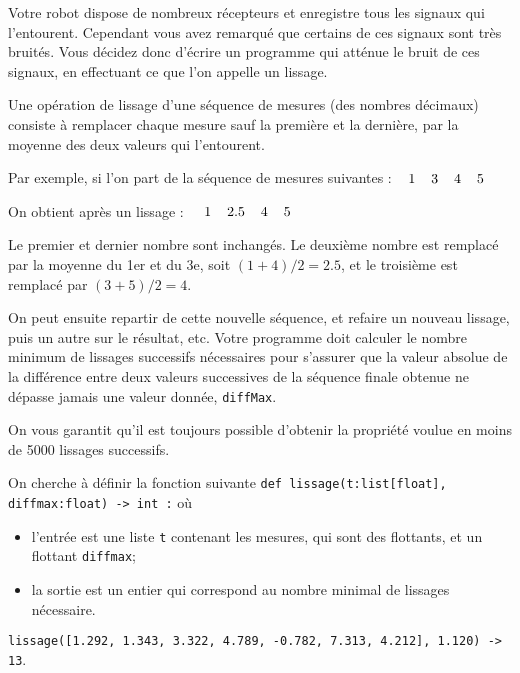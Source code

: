 \exer{}
\setcounter{numques}{0}

Votre robot dispose de nombreux récepteurs et enregistre tous les signaux qui l'entourent. Cependant 
vous avez remarqué que certains de ces signaux sont très bruités. Vous décidez donc d'écrire un 
programme qui atténue le bruit de ces signaux, en effectuant ce que l'on appelle un lissage.

Une opération de lissage d'une séquence de mesures (des nombres décimaux) consiste à remplacer 
chaque mesure sauf la première et la dernière, par la moyenne des deux valeurs qui l'entourent.

Par exemple, si l'on part de la séquence de mesures suivantes :$\hspace{.4cm}1\hspace{.4cm} 3\hspace{.4cm} 4\hspace{.4cm} 5$

On obtient après un lissage : $\hspace{.4cm}1\hspace{.4cm} 2.5\hspace{.4cm} 4\hspace{.4cm} 5$

Le premier et dernier nombre sont inchangés. Le deuxième nombre est remplacé par la moyenne du 1er 
et du 3e, soit $(1+4)/2 = 2.5$, et le troisième est remplacé par $(3+5)/2 = 4$.

On peut ensuite repartir de cette nouvelle séquence, et refaire un nouveau lissage, puis un autre 
sur le résultat, etc.
Votre programme doit calculer le nombre minimum de lissages successifs nécessaires pour s'assurer 
que la valeur absolue de la différence entre deux valeurs successives de la séquence finale obtenue 
ne dépasse jamais une valeur donnée, \texttt{diffMax}.

On vous garantit qu'il est toujours possible d'obtenir la propriété voulue en moins de 5000 lissages 
successifs.

On cherche à définir la fonction suivante \texttt{def lissage(t:list[float], diffmax:float) -> int :} où
\begin{itemize} 
\item l'entrée est une liste \texttt{t} contenant les mesures, qui sont des flottants, et un 
flottant \texttt{diffmax};
\item la sortie est un entier qui correspond au nombre minimal de lissages nécessaire.
\end{itemize}
\begin{exemple}
\noindent \texttt{lissage([1.292, 1.343, 3.322, 4.789, -0.782, 7.313, 4.212], 1.120) -> 13}.
\end{exemple}